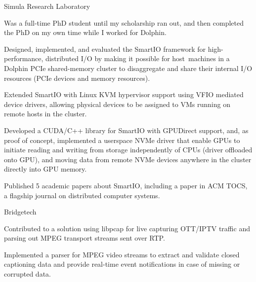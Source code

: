 \begin{experience}{Simula Research Laboratory}{
}
    \item{Was a full-time PhD student until my scholarship ran out, and then completed the PhD on my own time while I worked for Dolphin.}
    \item{Designed, implemented, and evaluated the SmartIO framework for high-performance, distributed I/O by making it possible for  host~machines in a Dolphin PCIe shared-memory cluster to disaggregate and share their internal I/O resources (PCIe devices and memory resources).}
    \item{Extended SmartIO with Linux KVM hypervisor support using VFIO mediated device drivers, allowing physical devices to be assigned to VMs running on remote hosts in the cluster.}
    \item{Developed a CUDA/C++ library for SmartIO with GPUDirect support, and, as proof of concept, implemented a userspace NVMe driver that enable GPUs to initiate reading and writing from storage independently of CPUs (driver offloaded onto GPU), and moving data from remote NVMe devices anywhere in the cluster directly into GPU memory.}
    \item{Published 5 academic papers about SmartIO, including a paper in ACM TOCS, a flagship journal on distributed computer systems.}
\end{experience}

\begin{experience}{Bridgetech}{}
    \item{Contributed to a solution using libpcap for live capturing OTT/IPTV traffic and parsing out MPEG transport streams sent over RTP.}
    \item{Implemented a parser for MPEG video streams to extract and validate closed captioning data and provide real-time event notifications in case of missing or corrupted data.}
\end{experience}




